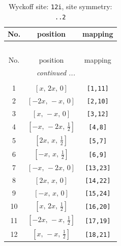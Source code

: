 \documentclass[fleqn,8pt]{jsarticle}
\begin{document}
\begin{longtable}{ccc}
\caption{Wyckoff site: {\tt 12i}, site symmetry: {\tt ..2}}
 \\
 \hline \hline
No. & position & mapping \\ \hline \endfirsthead

\multicolumn{2}{l}{\tablename\ \thetable{}} \\
 \hline \hline
No. & position & mapping \\ \hline \endhead

 \hline \hline
\multicolumn{2}{r}{\footnotesize\it continued ...} \\ \endfoot

 \hline \hline
\multicolumn{2}{r}{} \\ \endlastfoot

1 & $\left[ x,\, 2 x,\, 0 \right]$ & {\tt [1,11]} \\ \hline
2 & $\left[ - 2 x,\, - x,\, 0 \right]$ & {\tt [2,10]} \\ \hline
3 & $\left[ x,\, - x,\, 0 \right]$ & {\tt [3,12]} \\ \hline
4 & $\left[ - x,\, - 2 x,\, \frac{1}{2} \right]$ & {\tt [4,8]} \\ \hline
5 & $\left[ 2 x,\, x,\, \frac{1}{2} \right]$ & {\tt [5,7]} \\ \hline
6 & $\left[ - x,\, x,\, \frac{1}{2} \right]$ & {\tt [6,9]} \\ \hline
7 & $\left[ - x,\, - 2 x,\, 0 \right]$ & {\tt [13,23]} \\ \hline
8 & $\left[ 2 x,\, x,\, 0 \right]$ & {\tt [14,22]} \\ \hline
9 & $\left[ - x,\, x,\, 0 \right]$ & {\tt [15,24]} \\ \hline
10 & $\left[ x,\, 2 x,\, \frac{1}{2} \right]$ & {\tt [16,20]} \\ \hline
11 & $\left[ - 2 x,\, - x,\, \frac{1}{2} \right]$ & {\tt [17,19]} \\ \hline
12 & $\left[ x,\, - x,\, \frac{1}{2} \right]$ & {\tt [18,21]} \\
\end{longtable}
\renewcommand{\arraystretch}{1.2}
\end{document}
